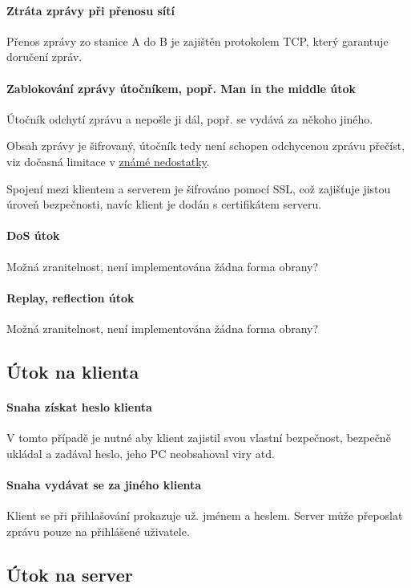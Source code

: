 \documentclass[a4paper]{article}
\begin{document}
\paragraph{Ztráta zprávy při přenosu sítí} Přenos zprávy zo stanice A do B je zajištěn protokolem TCP, který garantuje doručení zpráv.
\paragraph{Zablokování zprávy útočníkem, popř. Man in the middle útok} Útočník odchytí zprávu a nepošle ji dál, popř. se vydává za někoho jiného. 

Obsah zprávy je šifrovaný, útočník tedy není schopen odchycenou zprávu přečíst, viz dočasná limitace v \hyperref[sec:unfinished]{známé nedostatky}.

Spojení mezi klientem a serverem je šifrováno pomocí SSL, což zajišťuje jistou úroveň bezpečnosti, navíc klient je dodán s certifikátem serveru.

\paragraph{DoS útok} Možná zranitelnost, není implementována žádna forma obrany?

\paragraph{Replay, reflection útok} Možná zranitelnost, není implementována žádna forma obrany?

\subsection{Útok na klienta}
\paragraph{Snaha získat heslo klienta} V tomto případě je nutné aby klient zajistil svou vlastní bezpečnost, bezpečně ukládal a zadával heslo, jeho PC neobsahoval viry atd.
\paragraph{Snaha vydávat se za jiného klienta} Klient se při přihlašování prokazuje už. jménem a heslem. Server může přeposlat zprávu pouze na přihlášené uživatele.

\subsection{Útok na server}
\end{document}
